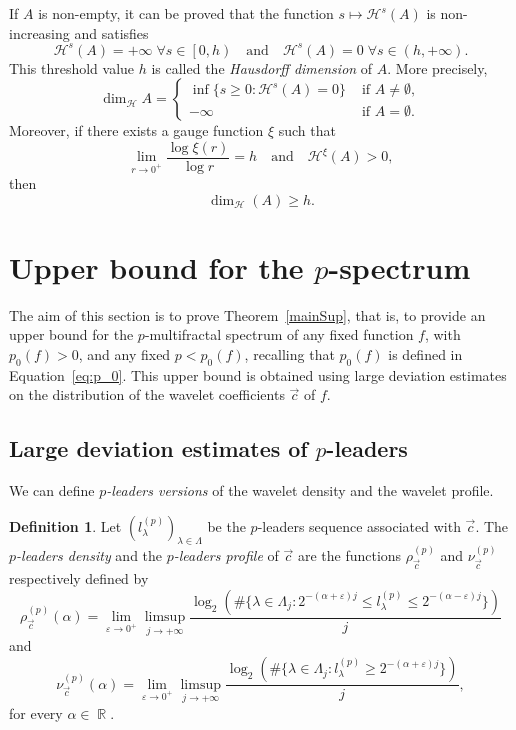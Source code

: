 \documentclass[a4paper,11pt,oneside]{article}
\DeclareMathOperator{\R}{\mathbb{R}}
\newcommand{\coint}[1]{\left[{#1}\right)}
\newcommand{\ooint}[1]{\left({#1}\right)}
\theoremstyle{definition}
\newtheorem{defi}{Definition}[section]
\theoremstyle{plain}
\begin{document}
If $A$ is non-empty, it can be proved that the function $s\mapsto \mathcal{H}^s(A)$ is non-increasing and satisfies 
\[
\mathcal{H}^s(A)=+\infty\;\forall s\in\coint{0,h}\quad\text{and}\quad \mathcal{H}^s(A)=0\;\forall s\in\ooint{h,+\infty}.
\]
This threshold value $h$ is called the \textit{Hausdorff dimension} of $A$. More precisely,
\[
\dim_{\mathcal{H}}A=\left\{\begin{array}{ll}
\inf\{s\geq 0:\mathcal{H}^s(A)=0\} & \text{ if }A\neq\emptyset, \\
-\infty & \text{ if }A=\emptyset.
\end{array}\right.
\]
Moreover, if there exists a gauge function $\xi$ such that
\[
\lim_{r\rightarrow0^+}\frac{\log\xi(r)}{\log r}=h \quad\text{and}\quad \mathcal{H}^\xi(A)>0,
\]
then
\[
\dim_{\mathcal{H}}(A)\geq h.
\]



\section{Upper bound for the $p$-spectrum}\label{secSup}



The aim of this section is to prove Theorem~\ref{mainSup}, that is, to provide an upper bound for the $p$-multifractal spectrum of any fixed function $f$, with $p_0(f)>0$, and any fixed $p<p_0(f)$, recalling that $p_0(f)$ is defined in Equation~\eqref{eq:p_0}. This upper bound is obtained using large deviation estimates on the distribution of the wavelet coefficients $\vec{c}$ of $f$.



\subsection{Large deviation estimates of $p$-leaders}\label{secSup1}



We can define \textit{$p$-leaders versions} of the wavelet density and the wavelet profile.

\begin{defi}
Let $(l^{(p)}_\lambda)_{\lambda\in\Lambda}$ be the $p$-leaders sequence associated with $\vec{c}$. 
The \textit{$p$-leaders density} and the \textit{$p$-leaders profile} of $\vec{c}$ are the functions $\rho^{(p)}_{\vec{c}}$ and $\nu^{(p)}_{\vec{c}}$ respectively defined by
\[
\rho^{(p)}_{\vec{c}}(\alpha)=\lim_{\varepsilon\rightarrow0^+}\limsup_{j\rightarrow+\infty}\frac{\log_2\left(\#\{\lambda\in\Lambda_j:2^{-(\alpha+\varepsilon)j}\leq l^{(p)}_\lambda\leq 2^{-(\alpha-\varepsilon)j}\}\right)}{j}
\]
and
\[
\nu^{(p)}_{\vec{c}}(\alpha)=\lim_{\varepsilon\rightarrow0^+}\limsup_{j\rightarrow+\infty}\frac{\log_2\left(\#\{\lambda\in\Lambda_j:l^{(p)}_\lambda\geq 2^{-(\alpha+\varepsilon)j}\}\right)}{j},
\]
for every $\alpha\in\R$.
\end{defi}
\end{document}
